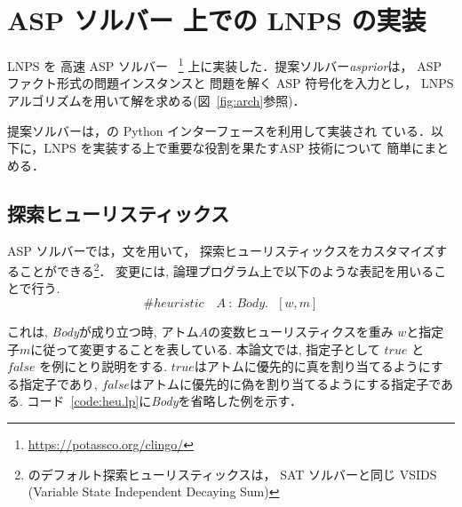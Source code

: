 \chapter{ASP ソルバー 上での LNPS の実装}



LNPS を 高速 ASP ソルバー
{\clingo}~\footnote{\url{https://potassco.org/clingo/}}
上に実装した．提案ソルバー\textit{asprior}は，
ASP ファクト形式の問題インスタンスと
問題を解く ASP 符号化を入力とし，
LNPS アルゴリズムを用いて解を求める(図~\ref{fig:arch}参照)．

提案ソルバーは，{\clingo}の Python インターフェースを利用して実装され
ている．以下に，LNPS を実装する上で重要な役割を果たすASP 技術について
簡単にまとめる．

\section{探索ヒューリスティックス}






ASP ソルバー{\clingo}では，文を用いて，
探索ヒューリスティックスをカスタマイズすることができる\footnote{%
{\clingo}のデフォルト探索ヒューリスティックスは，
SAT ソルバーと同じ VSIDS (Variable State Independent Decaying Sum)}．
変更には, 論理プログラム上で以下のような表記を用いることで行う. 
\begin{displaymath}
\#heuristic \quad A~ : ~Body. ~~~[w,m]
\end{displaymath}

これは, \textit{Body}が成り立つ時, アトム$A$の変数ヒューリスティクスを重み
$w$と指定子$m$に従って変更することを表している. 
本論文では, 指定子として $true$ と $false$ を例にとり説明をする. 
$true$はアトムに優先的に真を割り当てるようにする指定子であり, 
$false$はアトムに優先的に偽を割り当てるようにする指定子である. 
コード~\ref{code:heu.lp}に\textit{Body}を省略した例を示す．

